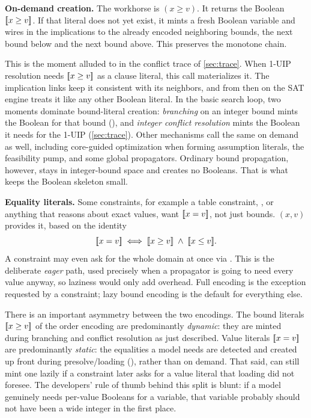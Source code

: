 \textbf{On-demand creation.} The workhorse is
$(x \ge v)$. It
returns the Boolean $[\![x \ge v]\!]$. If that literal does
not yet exist, it mints a fresh Boolean variable and wires in the implications to
the already encoded neighboring bounds, the next bound below and the
next bound above. This preserves the monotone chain.

This is the moment alluded to in the conflict trace of \cref{sec:trace}.
When 1-UIP resolution needs $[\![x \ge v]\!]$ as a clause literal, this call
materializes it. The implication links keep it consistent
with its neighbors, and from then on the SAT engine treats it like any other
Boolean literal. In the basic search loop, two moments dominate bound-literal
creation: \emph{branching} on an integer bound mints the Boolean for that
bound (), and
\emph{integer conflict resolution} mints the Boolean it needs for the 1-UIP
(\cref{sec:trace}). Other mechanisms call the same
 on demand as well, including core-guided
optimization when forming assumption literals, the feasibility pump, and some
global propagators. Ordinary bound propagation, however, stays in integer-bound
space and creates no Booleans. That is what keeps the Boolean skeleton small.

\textbf{Equality literals.} Some constraints, for example a table constraint,
, or anything that reasons about exact
values, want $[\![x = v]\!]$, not just bounds.
$(x, v)$
provides it, based on the identity
\[
  [\![x = v]\!] \;\Longleftrightarrow\;
  [\![x \ge v]\!] \;\wedge\; [\![x \le v]\!] .
\]
A constraint may even ask for the whole domain at once via
. This is the deliberate
\emph{eager} path, used precisely when a propagator is going to need every value
anyway, so laziness would only add overhead. Full encoding is the exception
requested by a constraint; lazy bound encoding is the default for everything
else.

There is an important asymmetry between the two encodings. The bound literals
$[\![x \ge v]\!]$ of the order encoding are predominantly \emph{dynamic}: they
are minted during branching and conflict resolution as just described. Value
literals $[\![x = v]\!]$ are predominantly \emph{static}: the
equalities a model needs are detected and created up front during
presolve/loading (), rather
than on demand. That said,
 can still mint one lazily if a
constraint later asks for a value literal that loading did not foresee. The
developers' rule of thumb behind this split is blunt: if a model genuinely needs
per-value Booleans for a variable, that variable probably should not have been a
wide integer in the first place.

